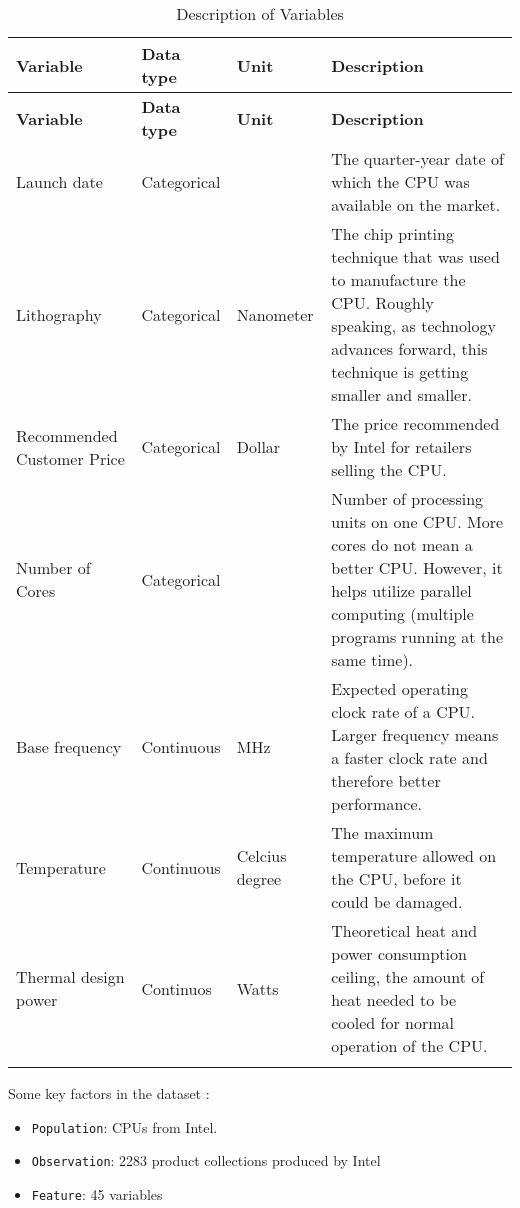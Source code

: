 \begin{longtable}{|m{3cm}|m{3cm}|m{3cm}|m{5cm}|}
  \hline
    \textbf{Variable} & \textbf{Data type} & \textbf{Unit} & \textbf{Description} \\
  \hline
  \endfirsthead
  \hline
  \textbf{Variable} & \textbf{Data type} & \textbf{Unit} & \textbf{Description} \\
  \hline
  \endhead
  
  Launch date\cite{ldate} & Categorical &  & The quarter-year date of which the CPU was available on the market.\\
  \hline
  Lithography\cite{litho} & Categorical & Nanometer & The chip printing technique that was used to manufacture the CPU. Roughly speaking, as technology advances forward, this technique is getting smaller and smaller.\\
  \hline
  Recommended Customer Price\cite{price} & Categorical & Dollar & The price recommended by Intel for retailers selling the CPU.\\
  \hline
  Number of Cores\cite{cores} & Categorical &  & Number of processing units on one CPU. More cores do not mean a better CPU. However, it helps utilize parallel computing (multiple programs running at the same time).\\
  \hline
  Base frequency\cite{freq} & Continuous & MHz & Expected operating clock rate of a CPU. Larger frequency means a faster clock rate and therefore better performance.\\
  \hline
  Temperature & Continuous & Celcius degree & The maximum temperature allowed on the CPU, before it could be damaged.\\
  \hline
  Thermal design power\cite{tdp}& Continuos & Watts & Theoretical heat and power consumption ceiling, the amount of heat
needed to be cooled for normal operation of the CPU. \\
  \hline
  \caption{Description of Variables} \\
\end{longtable}


Some key factors in the dataset :
\begin{itemize}
    \item \verb|Population|: CPUs from Intel.
    \item \verb|Observation|: 2283 product collections produced by Intel
    \item \verb|Feature|: 45 variables
\end{itemize}